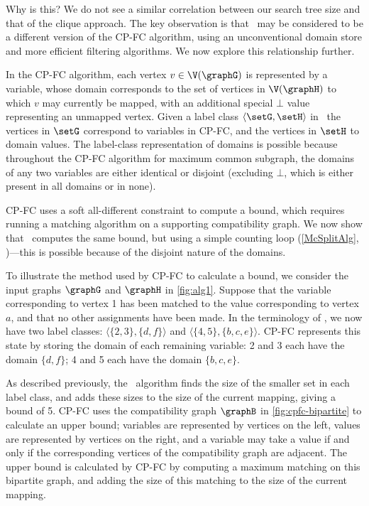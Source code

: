 Why is this? We do not see a similar correlation between our search tree size
and that of the clique approach. The key observation is that \McSplit\ may be
considered to be a different version of the CP-FC algorithm, using
an unconventional domain store and more efficient filtering algorithms. We now
explore this relationship further.

In the CP-FC algorithm, each vertex $v \in \V(\graphG)$ is represented by a
variable, whose domain corresponds to the set of vertices in $\V(\graphH)$ to
which $v$ may currently be mapped, with an additional special $\bot$ value
representing an unmapped vertex.  Given a label class $\langle \setG,\setH
\rangle$ in \McSplit\, the vertices in $\setG$ correspond to variables in
CP-FC, and the vertices in $\setH$ to domain values. The label-class
representation of domains is possible because throughout the CP-FC algorithm
for maximum common subgraph, the domains of any two variables are either
identical or disjoint (excluding $\bot$, which is either present in all domains or in none).

CP-FC uses a soft all-different constraint to compute a bound, which requires
running a matching algorithm on a supporting compatibility graph.  We now
show that \McSplit\ computes the same bound, but using a simple
counting loop (\cref{McSplitAlg}, )---this is possible
because of the disjoint nature of the domains.

To illustrate the method used by CP-FC to calculate a bound, we consider the
input graphs $\graphG$ and $\graphH$ in \cref{fig:alg1}. Suppose that the
variable corresponding to vertex 1 has been matched to the value corresponding
to vertex $a$, and that no other assignments have been made.  In the
terminology of \McSplit, we now have two label classes: $\langle \{2,3\},
\{d,f\} \rangle$ and $\langle \{4,5\}, \{b,c,e\} \rangle$.  CP-FC represents
this state by storing the domain of each remaining variable: 2 and 3 each
have the domain $\{d,f\}$; 4 and 5 each have the domain $\{b,c,e\}$.

As described previously, the \McSplit\ algorithm finds the size of the smaller
set in each label class, and adds these sizes to the size of the current
mapping, giving a bound of 5.  CP-FC uses the compatibility graph $\graphB$ in
\cref{fig:cpfc-bipartite} to calculate an upper bound; variables are
represented by vertices on the left, values are represented by vertices on the
right, and a variable may take a value if and only if the corresponding
vertices of the compatibility graph are adjacent.  The upper bound is
calculated by CP-FC by computing a maximum matching on this bipartite graph,
and adding the size of this matching to the size of the current mapping.

